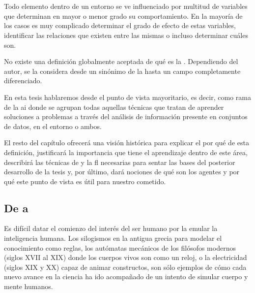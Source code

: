 \chapter{}
\label{ch:sota-ci}

Todo elemento dentro de un entorno se ve influenciado por multitud de variables que determinan en mayor o menor grado su comportamiento. En la mayoría de los casos es muy complicado determinar el grado de efecto de estas variables, identificar las relaciones que existen entre las mismas o incluso determinar cuáles son.

No existe una definición globalmente aceptada de qué es la . Dependiendo del autor, se la considera desde un sinónimo de la  hasta un campo completamente diferenciado.

En esta tesis hablaremos desde el punto de vista mayoritario, es decir, como rama de la \acrshort{ai} donde se agrupan todas aquellas técnicas que tratan de aprender soluciones a problemas a través del análisis de información presente en conjuntos de datos, en el entorno o ambos.

El resto del capítulo ofrecerá una visión histórica para explicar el por qué de esta definición, justificará la importancia que tiene el aprendizaje dentro de este área, describirá las técnicas de  y la \acrlong{fl} necesarias para sentar las bases del posterior desarrollo de la tesis y, por último, dará nociones de qué son los agentes y por qué este punto de vista es útil para nuestro cometido.

\section{De  a }

Es difícil datar el comienzo del interés del ser humano por la emular la inteligencia humana. Los silogismos en la antigua grecia para modelar el conocimiento como reglas, los autómatas mecánicos de los filósofos modernos (siglos XVII al XIX) donde los cuerpos vivos son como un reloj, o la electricidad (siglos XIX y XX) capaz de animar constructos, son sólo ejemplos de cómo cada nuevo avance en la ciencia ha ido acompañado de un intento de simular cuerpo y mente humanos.

